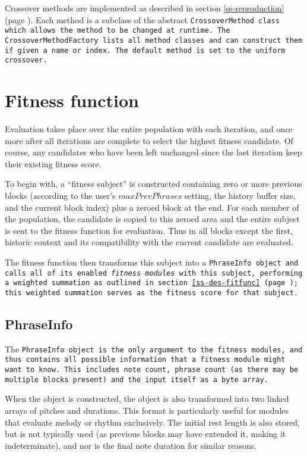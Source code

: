 Crossover methods are implemented as described in section \ref{ss-reproduction} (page \pageref{ss-reproduction}). Each method is a subclass of the abstract \tt{CrossoverMethod} class which allows the method to be changed at runtime. The \tt{CrossoverMethodFactory} lists all method classes and can construct them if given a name or index. The default method is set to the uniform crossover.

\section{Fitness function}

Evaluation takes place over the entire population with each iteration, and once more after all iterations are complete to select the highest fitness candidate. Of course, any candidates who have been left unchanged since the last iteration keep their existing fitness score.

To begin with, a ``fitness subject'' is constructed containing zero or more previous blocks (according to the user's $maxPrevPhrases$ setting, the history buffer size, and the current block index) plus a zeroed block at the end. For each member of the population, the candidate is copied to this zeroed area and the entire subject is sent to the fitness function for evaluation. Thus in all blocks except the first, historic context and its compatibility with the current candidate are evaluated.

The fitness function then transforms this subject into a \tt{PhraseInfo} object and calls all of its enabled \emph{fitness modules} with this subject, performing a weighted summation as outlined in section \ref{ss-des-fitfunc} (page \pageref{ss-des-fitfunc}); this weighted summation serves as the fitness score for that subject.

\subsection{PhraseInfo}
\label{ss-phraseinfo}

The \tt{PhraseInfo} object is the only argument to the fitness modules, and thus contains all possible information that a fitness module might want to know. This includes note count, phrase count (as there may be multiple blocks present) and the input itself as a byte array.

When the object is constructed, the object is also transformed into two linked arrays of pitches and durations. This format is particularly useful for modules that evaluate melody or rhythm exclusively. The initial rest length is also stored, but is not typically used (as previous blocks may have extended it, making it indeterminate), and nor is the final note duration for similar reasons. 

